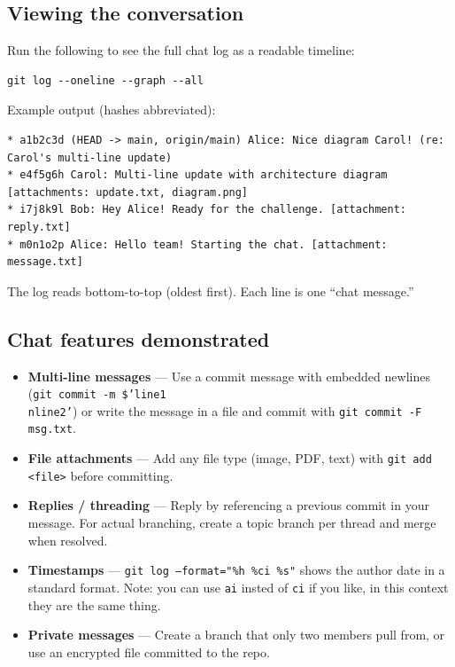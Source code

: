 \documentclass[twoside=false,DIV=14]{scrartcl}
\begin{document}
\subsection*{Viewing the conversation}

Run the following to see the full chat log as a readable timeline:

\begin{lstlisting}
git log --oneline --graph --all
\end{lstlisting}

Example output (hashes abbreviated):

\begin{lstlisting}
* a1b2c3d (HEAD -> main, origin/main) Alice: Nice diagram Carol! (re: Carol's multi-line update)
* e4f5g6h Carol: Multi-line update with architecture diagram [attachments: update.txt, diagram.png]
* i7j8k9l Bob: Hey Alice! Ready for the challenge. [attachment: reply.txt]
* m0n1o2p Alice: Hello team! Starting the chat. [attachment: message.txt]
\end{lstlisting}

The log reads bottom-to-top (oldest first).  Each line is one ``chat message.''

\subsection*{Chat features demonstrated}

\begin{itemize}
    \item \textbf{Multi-line messages} --- Use a commit message with embedded newlines (\texttt{git commit -m \$'line1\\nline2'}) or write the message in a file and commit with \texttt{git commit -F msg.txt}.
    \item \textbf{File attachments} --- Add any file type (image, PDF, text) with \texttt{git add <file>} before committing.
    \item \textbf{Replies / threading} --- Reply by referencing a previous commit in your message.  For actual branching, create a topic branch per thread and merge when resolved.
    \item \textbf{Timestamps} --- \texttt{git log --format="\%h \%ci \%s"} shows the author date in a standard format.  Note: you can use \texttt{ai} insted of \texttt{ci} if you like, in this context they are the same thing.
    \item \textbf{Private messages} --- Create a branch that only two members pull from, or use an encrypted file committed to the repo.
\end{itemize}
\end{document}
